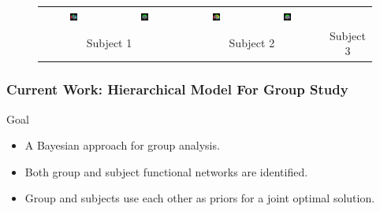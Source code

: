 \documentclass[serif]{beamer}
\begin{document}
\begin{frame}
\begin{figure}[htb]
\begin{center}
\begin{tabular}{cccccc}
      \includegraphics[width=0.12\textwidth]{figures/wholebrain/sub2/saggital0029} &
      \includegraphics[width=0.12\textwidth]{figures/wholebrain/sub2/coronal0029} &
      \includegraphics[width=0.12\textwidth]{figures/wholebrain/sub5/saggital0029} &
      \includegraphics[width=0.12\textwidth]{figures/wholebrain/sub5/coronal0029}\\

      \multicolumn{2}{c}{\small Subject 1} &
      \multicolumn{2}{c}{\small Subject 2} &
      \multicolumn{2}{c}{\small Subject 3}
    \end{tabular}
  \end{center}
\end{figure}
\end{frame}
\begin{frame}
\frametitle{Current Work: Hierarchical Model For Group Study~\cite{Liu2012aCopy} }
\begin{block}{Goal}
  \begin{itemize}
    \item A Bayesian approach for group analysis.
    \item Both group and subject functional networks are identified.
    \item Group and subjects use each other as priors for a joint optimal solution.
  \end{itemize}
\end{block}
\end{frame}
\end{document}
